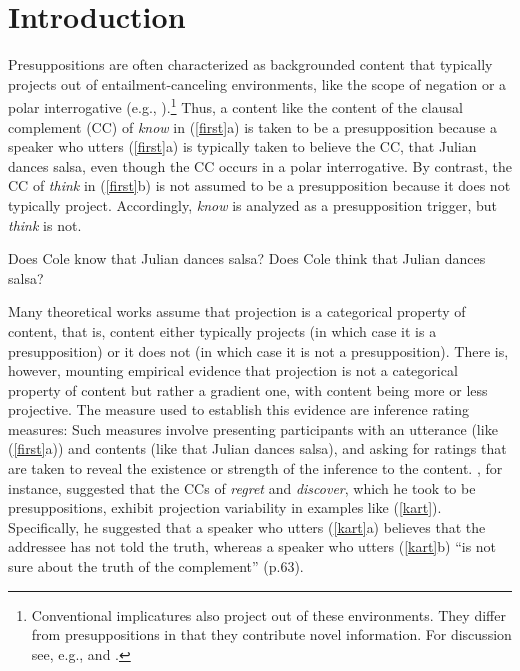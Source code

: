 \documentclass[11pt,fleqn]{article}
\newcommand{\6}{\mbox{$[\hspace*{-.6mm}[$}}
\newcommand{\9}{\mbox{$]\hspace*{-.6mm}]$}}
\begin{document}
\section{Introduction}\label{s1}

Presuppositions are often characterized as backgrounded content that typically projects out of entailment-canceling environments, like the scope of negation or a polar interrogative (e.g., \citealt{ccmg90}).\footnote{Conventional implicatures also project out of these environments. They differ from presuppositions in that they contribute novel information. For discussion see, e.g., \citealt{ccmg90} and \citealt{potts05}.} Thus, a content like the content of the clausal complement (CC) of {\em know} in (\ref{first}a) is taken to be a presupposition because a speaker who utters (\ref{first}a) is typically taken to believe the CC, that Julian dances salsa, even though the CC occurs in a polar interrogative. By contrast, the CC of {\em think} in (\ref{first}b) is not assumed to be a presupposition because it does not typically project. Accordingly, {\em know} is analyzed as a presupposition trigger, but {\em think} is not.

\begin{exe}
\ex\label{first} 
\begin{xlist}
\ex Does Cole know that Julian dances salsa?
\ex Does Cole think that Julian dances salsa?
\end{xlist}
\end{exe}

Many theoretical works assume that projection is a categorical property of  content, that is, content either typically projects (in which case it is a presupposition) or it does not (in which case it is not a presupposition). There is, however, mounting empirical evidence that projection is not a categorical property of  content but rather a gradient one, with content being more or less projective. The measure used to establish this evidence are inference rating measures: Such measures involve presenting participants with an utterance (like (\ref{first}a)) and contents (like that Julian dances salsa), and asking for ratings that are taken to reveal the existence or strength of the inference to the content. \citealt{karttunen71b}, for instance, suggested that the CCs of {\em regret} and {\em discover}, which he took to be presuppositions, exhibit projection variability in examples like (\ref{kart}). Specifically, he suggested that a speaker who utters (\ref{kart}a) believes that the addressee has not told the truth, whereas a speaker who utters (\ref{kart}b) ``is not sure about the truth of the complement'' (p.63).
\end{document}
